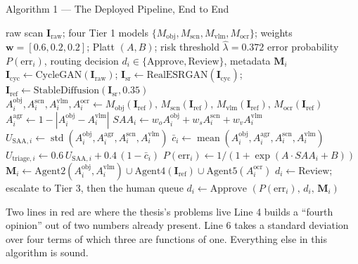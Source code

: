 \documentclass[aspectratio=169,11pt]{beamer}
\begin{document}
\begin{frame}{Algorithm 1 --- The Deployed Pipeline, End to End}
\tiny
\begin{algorithmic}[1]
\Require raw scan $\mathbf{I}_{\text{raw}}$; four Tier 1 models $\{M_{\text{obj}}, M_{\text{scn}}, M_{\text{vlm}}, M_{\text{ocr}}\}$; weights $\mathbf{w}=[0.6,0.2,0.2]$; Platt $(A,B)$; risk threshold $\hat\lambda = 0.372$
\Ensure error probability $P(\text{err}_i)$, routing decision $d_i \in \{\text{Approve}, \text{Review}\}$, metadata $\mathbf{M}_i$
\State $\mathbf{I}_{\text{cyc}} \leftarrow \text{CycleGAN}(\mathbf{I}_{\text{raw}})$; \; $\mathbf{I}_{\text{sr}} \leftarrow \text{RealESRGAN}(\mathbf{I}_{\text{cyc}})$; \; $\mathbf{I}_{\text{ref}} \leftarrow \text{StableDiffusion}(\mathbf{I}_{\text{sr}}, 0.35)$
\State $A^{\text{obj}}_i, A^{\text{scn}}_i, A^{\text{vlm}}_i, A^{\text{ocr}}_i \leftarrow M_{\text{obj}}(\mathbf{I}_{\text{ref}}),\, M_{\text{scn}}(\mathbf{I}_{\text{ref}}),\, M_{\text{vlm}}(\mathbf{I}_{\text{ref}}),\, M_{\text{ocr}}(\mathbf{I}_{\text{ref}})$
\State $A^{\text{agr}}_i \leftarrow 1 - |A^{\text{obj}}_i - A^{\text{vlm}}_i|$ \Comment{\textcolor{red}{derived, not a fifth model}}
\State $SAA_i \leftarrow w_o A^{\text{obj}}_i + w_s A^{\text{scn}}_i + w_v A^{\text{vlm}}_i$ 
\State $U_{\text{SAA},i} \leftarrow \operatorname{std}(A^{\text{obj}}_i, A^{\text{agr}}_i, A^{\text{scn}}_i, A^{\text{vlm}}_i)$ \Comment{\textcolor{red}{Level 3 --- the central claim}}
\State $\bar{c}_i \leftarrow \operatorname{mean}(A^{\text{obj}}_i, A^{\text{agr}}_i, A^{\text{scn}}_i, A^{\text{vlm}}_i)$
\State $U_{\text{triage},i} \leftarrow 0.6\,U_{\text{SAA},i} + 0.4\,(1-\bar{c}_i)$ 
\State $P(\text{err}_i) \leftarrow 1 / (1 + \exp(A\cdot SAA_i + B))$
\State $\mathbf{M}_i \leftarrow \text{Agent2}(A^{\text{obj}}_i, A^{\text{vlm}}_i) \cup \text{Agent4}(\mathbf{I}_{\text{ref}}) \cup \text{Agent5}(A^{\text{ocr}}_i)$ 
 \State $d_i \leftarrow \text{Review}$; escalate to Tier 3, then the human queue
\Else \State $d_i \leftarrow \text{Approve}$
\EndIf
\State \Return $(P(\text{err}_i),\, d_i,\, \mathbf{M}_i)$
\end{algorithmic}
\vspace{1mm}
\begin{alertblock}{\scriptsize Two lines in red are where the thesis's problems live}
\scriptsize Line 4 builds a ``fourth opinion'' out of two numbers already present. Line 6 takes a standard deviation over four terms of which three are functions of one. Everything else in this algorithm is sound.
\end{alertblock}
\end{frame}
\end{document}
